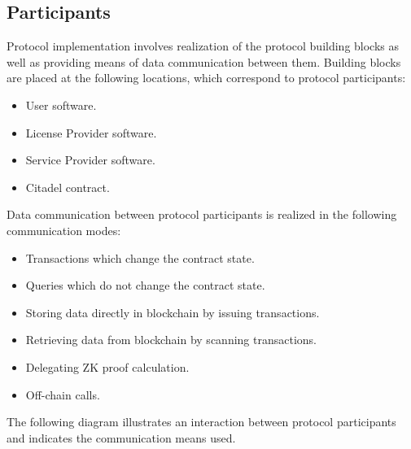 
\subsection{Participants} 
Protocol implementation involves realization of the protocol building blocks as well as providing means of data communication between them. Building blocks are placed at the following locations, which correspond to protocol participants:

\begin{itemize}%
	\item User software.
	\item License Provider software.
	\item Service Provider software.
	\item Citadel contract.
\end{itemize}

\begin{flushleft}
Data communication between protocol participants is realized in the following communication modes:
\end{flushleft}

\begin{itemize}%
	\item Transactions which change the contract state.
	\item Queries which do not change the contract state.
	\item Storing data directly in blockchain by issuing transactions.
	\item Retrieving data from blockchain by scanning transactions.
	\item Delegating ZK proof calculation.
	\item Off-chain calls.
\end{itemize}

\begin{flushleft}
The following diagram illustrates an interaction between protocol participants and indicates the communication means used.
\end{flushleft}

